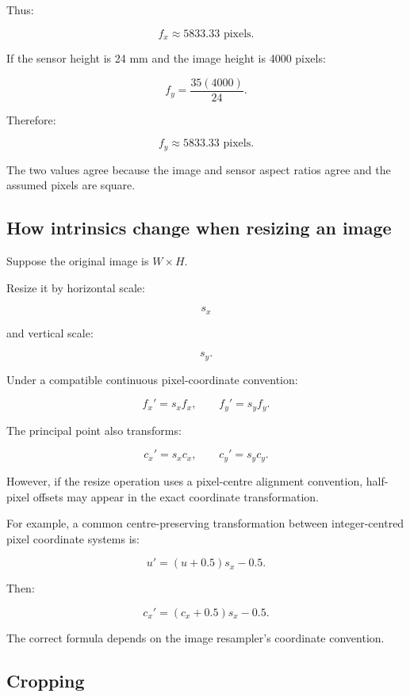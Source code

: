 Thus:

\[
 \boxed{ f_x\approx5833.33\text{ pixels} }.
\]

If the sensor height is 24 mm and the image height is 4000 pixels:

\[
 f_y=\frac{35(4000)}{24}.
\]

Therefore:

\[
 \boxed{ f_y\approx5833.33\text{ pixels} }.
\]

The two values agree because the image and sensor aspect ratios agree and the assumed pixels are square.

\subsection{How intrinsics change when resizing an image}\label{02-foundations-ii-ch034-how-intrinsics-change-when-resizing-an-image}

\hypertarget{02-foundations-ii-ch034-how-intrinsics-change-when-resizing-an-image}{}

Suppose the original image is \(W\times H\).

Resize it by horizontal scale:

\[
 s_x
\]

and vertical scale:

\[
 s_y.
\]

Under a compatible continuous pixel-coordinate convention:

\[
 \boxed{ f_x'=s_xf_x, \qquad f_y'=s_yf_y }.
\]

The principal point also transforms:

\[
 \boxed{ c_x'=s_xc_x, \qquad c_y'=s_yc_y }.
\]

However, if the resize operation uses a pixel-centre alignment convention, half-pixel offsets may appear in the exact coordinate transformation.

For example, a common centre-preserving transformation between integer-centred pixel coordinate systems is:

\[
 u'=(u+0.5)s_x-0.5.
\]

Then:

\[
 \boxed{ c_x'=(c_x+0.5)s_x-0.5 }.
\]

The correct formula depends on the image resampler's coordinate convention.

\subsection{Cropping}\label{02-foundations-ii-ch034-cropping}

